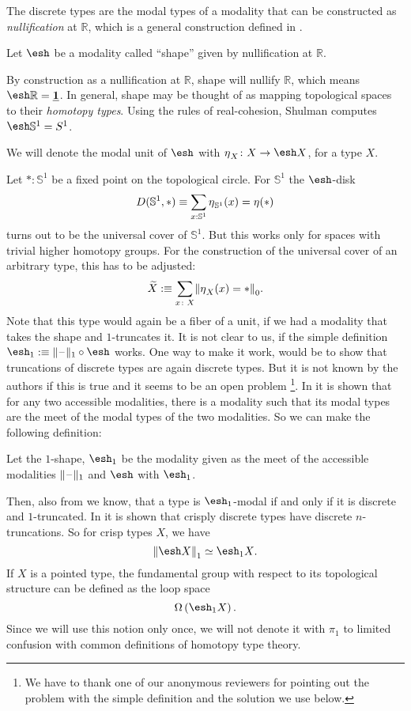 \documentclass[9pt,twosided]{amsart}
\newcommand{\shape}{\ensuremath{\mathord{\raisebox{0.5pt}{\text{\rm\esh}}}}}
\newcommand{\bR}{\mathbb R}
\newcommand{\bS}{\mathbb S}
\begin{document}
The discrete types are the modal types of a modality that can be constructed as \emph{nullification} at $\bR$,
which is a general construction defined in \cite[Section 2.3]{RijkeSpittersShulman}.
\begin{defn}
  Let $\shape$ be a modality called ``shape'' given by nullification at $\bR$.
\end{defn}
By construction as a nullification at $\bR$, shape will nullify $\bR$, which means $\shape \bR=\unit$. 
In general, shape may be thought of as mapping topological spaces to their \emph{homotopy types}.
Using the rules of real-cohesion, Shulman computes $\shape \bS^1 =\sphere{1}$.

We will denote the modal unit of $\shape$ with $\modalunit_X\colon X \to \shape X$, for a type $X$.

Let $\ast:\bS^1$ be a fixed point on the topological circle.
For $\bS^{1}$ the $\shape$-disk
\[ D (\bS^1,\ast) \equiv \sum_{x:\bS^{1}}\modalunit_{\bS^{1}}(x)=\modalunit(\ast) \]
turns out to be the universal cover of $\bS^{1}$.
But this works only for spaces with trivial higher homotopy groups. 
For the construction of the universal cover of an arbitrary type, this has to be adjusted:
\[ \widetilde{X}:\equiv \sum_{x\colon X} \trunc{0}{\modalunit_X(x)=\ast}. \]
Note that this type would again be a fiber of a unit, if we had a modality that takes the shape and $1$-truncates it.
It is not clear to us, if the simple definition $\shape_1:\equiv\trunc{1}{\blank}\circ\shape$ works.
One way to make it work, would be to show that truncations of discrete types are again discrete types.
But it is not known by the authors if this is true and it seems to be an open problem
\footnote{We have to thank one of our anonymous reviewers for pointing out the problem with the simple definition and the solution we use below.}.
In \cite[Theorem 3.28]{RijkeSpittersShulman} it is shown that for any two accessible modalities,
there is a modality such that its modal types are the meet of the modal types of the two modalities.
So we can make the following definition:
\begin{defn}
Let the $1$-shape, $\shape_1$ be the modality given as the meet of the accessible modalities $\trunc{1}{\blank}$ and $\shape$ with $\shape_1$.
\end{defn}
Then, also from \cite{RijkeSpittersShulman} we know, that a type is $\shape_1$-modal if and only if it is discrete and $1$-truncated.
In \cite[Theorem 6.21]{ShulmanRealCohesion} it is shown that crisply discrete types have discrete $n$-truncations.
So for crisp types $X$, we have
\[ \trunc{1}{\shape X} \simeq \shape_1 X\text{.} \]
If $X$ is a pointed type, the fundamental group with respect to its topological structure can be defined as the loop space
\[ \Omega \left(\shape_1 X\right). \]
Since we will use this notion only once, we will not denote it with $\pi_1$ to limited confusion with common definitions of homotopy type theory.
\end{document}
